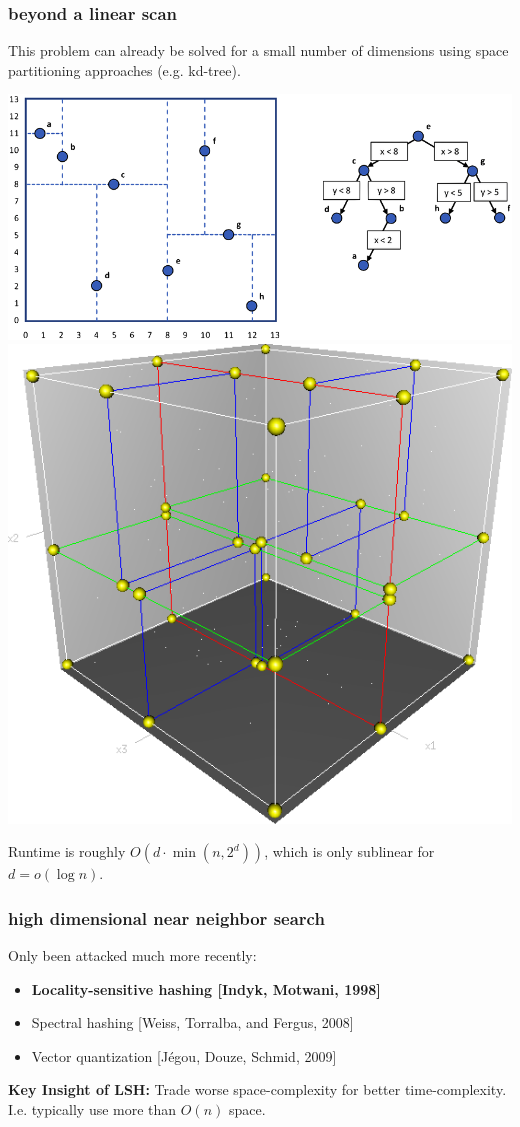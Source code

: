 \documentclass[compress]{beamer}
\begin{document}
\begin{frame}
	\frametitle{beyond a linear scan}	
	This problem can already be solved for a small number of dimensions using space partitioning approaches (e.g. kd-tree).
	
	\includegraphics[height=.4\textheight]{kdtree.png}	\includegraphics[height=.4\textheight]{3dtree.png}
	
	Runtime is roughly $O(d\cdot \min(n,2^d))$, which is only sublinear for $d = o(\log n)$.

\end{frame}

\begin{frame}
	\frametitle{high dimensional near neighbor search}	
	Only been attacked much more recently:
	\begin{itemize}
		\item \textbf{\alert{Locality-sensitive hashing [Indyk, Motwani, 1998]}}
		\item Spectral hashing [Weiss, Torralba, and Fergus, 2008]
		\item Vector quantization [J\'{e}gou, Douze, Schmid, 2009]
	\end{itemize}

\textbf{Key Insight of LSH:} Trade worse space-complexity for better time-complexity. I.e. typically use more than $O(n)$ space.
\end{frame}
\end{document}
